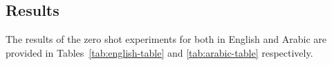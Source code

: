 \documentclass[letterpaper]{article}
\begin{document}

\subsection{Results}

The results of the zero shot experiments for both in English and Arabic are provided in Tables~\ref{tab:english-table} and \ref{tab:arabic-table} respectively.
\end{document}
